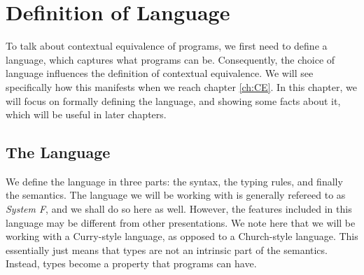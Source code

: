 \documentclass[a4paper, 11pt]{report}
\theoremstyle{definition}
\begin{document}

\chapter{Definition of Language}
\label{ch:DoL}
To talk about contextual equivalence of programs, we first need to define a language, which captures what programs can be. Consequently, the choice of language influences the definition of contextual equivalence. We will see specifically how this manifests when we reach chapter \ref{ch:CE}. In this chapter, we will focus on formally defining the language, and showing some facts about it, which will be useful in later chapters.


\section{The Language}
We define the language in three parts: the syntax, the typing rules, and finally the semantics. The language we will be working with is generally refereed to as \textit{System F}, and we shall do so here as well. However, the features included in this language may be different from other presentations. We note here that we will be working with a Curry-style language, as opposed to a Church-style language. This essentially just means that types are not an intrinsic part of the semantics. Instead, types become a property that programs can have.
\end{document}
